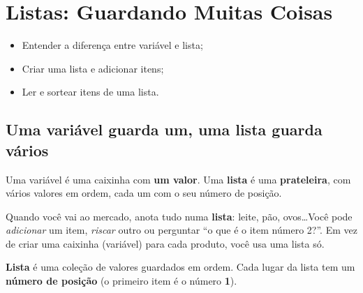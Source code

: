 \chapter{Listas: Guardando Muitas Coisas}

\begin{objetivos}
\begin{itemize}
\item Entender a diferença entre variável e lista;
\item Criar uma lista e adicionar itens;
\item Ler e sortear itens de uma lista.
\end{itemize}
\end{objetivos}

\section{Uma variável guarda um, uma lista guarda vários}

Uma variável é uma caixinha com \textbf{um valor}. Uma \textbf{lista} é uma \textbf{prateleira}, com vários valores em ordem, cada um com o seu número de posição.

\begin{center}
\end{center}

\begin{pensaassim}
Quando você vai ao mercado, anota tudo numa \textbf{lista}: leite, pão, ovos\ldots Você pode \emph{adicionar} um item, \emph{riscar} outro ou perguntar ``o que é o item número 2?''. Em vez de criar uma caixinha (variável) para cada produto, você usa uma lista só.
\end{pensaassim}

\begin{vocabulario}
\textbf{Lista} é uma coleção de valores guardados em ordem. Cada lugar da lista tem um \textbf{número de posição} (o primeiro item é o número \textbf{1}).
\end{vocabulario}

